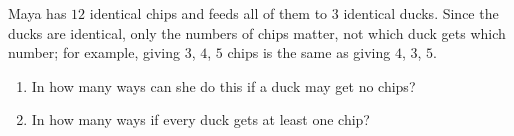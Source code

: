 Maya has $12$ identical chips and feeds all of them to $3$ identical ducks. Since the ducks are identical, only the numbers of chips matter, not which duck gets which number; for example, giving $3$, $4$, $5$ chips is the same as giving $4$, $3$, $5$.
\begin{enumerate}
\item[(a)] In how many ways can she do this if a duck may get no chips?
\item[(b)] In how many ways if every duck gets at least one chip?
\end{enumerate}
